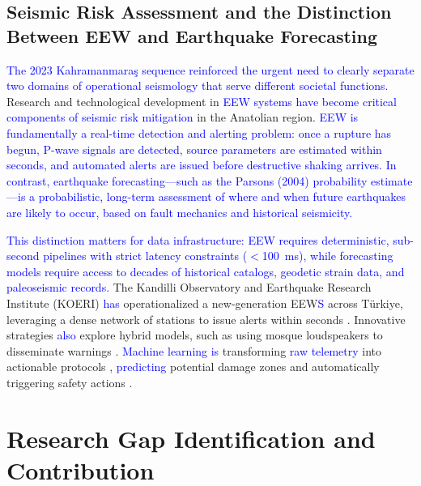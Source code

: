 \documentclass[data,article,submit,pdftex,moreauthors]{Definitions/mdpi}
\begin{document}
\subsection{Seismic Risk Assessment and the Distinction Between EEW and Earthquake Forecasting}

\textcolor{blue}{The 2023 Kahramanmaraş sequence reinforced the urgent need to clearly separate two domains of operational seismology that serve different societal functions.} Research and technological development in \textcolor{blue}{EEW systems have become critical components of seismic risk mitigation} in the Anatolian region. \textcolor{blue}{EEW is fundamentally a real-time detection and alerting problem: once a rupture has begun, P-wave signals are detected, source parameters are estimated within seconds, and automated alerts are issued before destructive shaking arrives. In contrast, earthquake forecasting—such as the Parsons (2004) probability estimate—is a probabilistic, long-term assessment of where and when future earthquakes are likely to occur, based on fault mechanics and historical seismicity.}

\textcolor{blue}{This distinction matters for data infrastructure: EEW requires deterministic, sub-second pipelines with strict latency constraints ($<$100~ms), while forecasting models require access to decades of historical catalogs, geodetic strain data, and paleoseismic records.} The Kandilli Observatory and Earthquake Research Institute (KOERI) \textcolor{blue}{has} operationalized a new-generation EEW\textcolor{blue}{S} across Türkiye\textcolor{blue}{,} leveraging a dense network of stations to issue alerts within seconds \cite{Ozeletal2026}. Innovative strategies \textcolor{blue}{also} explore hybrid models, such as using mosque loudspeakers to disseminate warnings \cite{Eren2025}. \textcolor{blue}{Machine learning is} transforming \textcolor{blue}{raw telemetry} into actionable protocols \cite{Doganetal2019}, \textcolor{blue}{predicting} potential damage zones and automatically triggering safety actions \cite{CremenGalasso2020,Specialeetal2026}.

\section{Research Gap Identification and Contribution}
\end{document}
